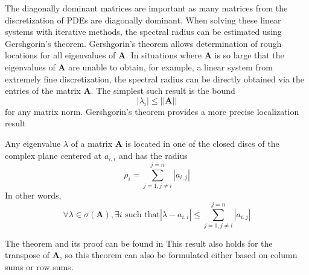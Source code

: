 The diagonally dominant matrices are important as many matrices from the discretization of PDEs are diagonally dominant. When solving these linear systems with iterative methods, the spectral radius can be estimated using Gershgorin's theorem. Gershgorin's theorem allows determination of rough locations for all eigenvalues of $\boldsymbol{A}$. 
In situations where $\boldsymbol{A}$ is so large that the eigenvalues of $\boldsymbol{A}$ are unable to obtain, for example, a linear system from extremely fine discretization, the spectral radius can be directly obtained via the entries of the matrix $\boldsymbol{A}$. The simplest such result is the bound \begin{equation}
    |\lambda_i| \leq ||\boldsymbol{A}||
\end{equation}
for any matrix norm. Gershgorin's theorem provides a more precise localization result
\begin{theorem}[Gershgorin]
Any eigenvalue $\lambda$ of a matrix $\boldsymbol{A}$ is located in one of the closed discs of the complex plane centered at $a_{i, i}$ and has the radius
\begin{equation}
    \rho_i = \sum_{j = 1, j \neq i}^{j=n}|a_{i,j}|
\end{equation}
In other words,
\begin{equation}
    \forall \lambda \in \sigma(\boldsymbol{A}), \exists  i \text{ such that} |\lambda - a_{i,i}| \leq \sum_{j = 1, j \neq i}^{j = n}|a_{i,j}|
\end{equation}
\end{theorem}
The theorem and its proof can be found in \citep{doi:10.1137/1.9780898718003}
This result also holds for the transpose of $\boldsymbol{A}$, so this theorem can also be formulated either based on column sums or row sums.
